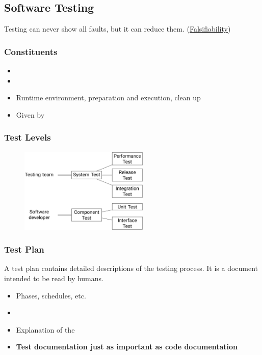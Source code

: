 \documentclass[
    ../../Software_Engineering_Summary.tex,
]
{subfiles}
\begin{document}
\subsection{Software Testing}
Testing can never show all faults, but it can reduce them. (\href{https://en.wikipedia.org/wiki/Falsifiability}{Falsifiability})

\subsubsection{Constituents}
\begin{defbox*}
    \begin{itemize}
        \item {}
        \item {}
        \item {} Runtime environment, preparation and execution, clean up
        \item {} Given by 
    \end{itemize}
\end{defbox*}

\subsubsection{Test Levels}
\begin{figure}
    [H]
    \centering
    \includegraphics[width = 0.55\textwidth]{Pics/10/TestLevels.png}
\end{figure}

\subsubsection{Test Plan}
A test plan contains detailed descriptions of the testing process. It is a document intended to be read by humans.

\begin{itemize}
    \item {} Phases, schedules, etc.
    \item {}
    \item Explanation of the 
    \item \textbf{Test documentation just as important as code documentation}
\end{itemize}
\end{document}
